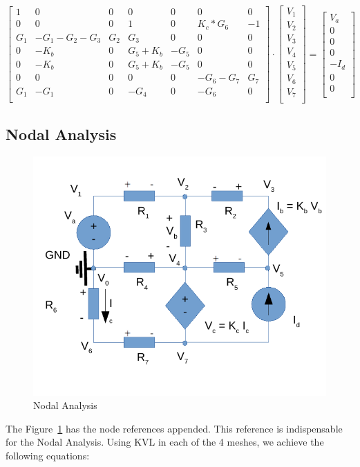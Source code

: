 \[
\begin{bmatrix}
1 & 0 & 0 & 0 & 0 & 0 & 0\\
0 & 0 & 0 & 1 & 0 & K_c * G_6 & -1\\
G_1 & -G_1-G_2 - G_3 & G_2 & G_3 & 0 & 0 & 0\\
0 & -K_b & 0 & G_5 + K_b & -G_5 & 0 & 0\\
0 & -K_b & 0 & G_5 + K_b & -G_5 & 0 & 0\\
0 & 0 & 0 & 0 & 0 & -G_6-G_7 & G_7\\
G_1 & -G_1 & 0 & -G_4 & 0 & -G_6 & 0\\
\end{bmatrix}
\cdot
\begin{bmatrix}
V_1\\
V_2\\
V_3\\
V_4\\
V_5\\
V_6\\
V_7\\
\end{bmatrix}
=
\begin{bmatrix}
V_a\\
0\\
0\\
0\\
-I_d\\
0\\
0\\
\end{bmatrix}
\]


\subsection{Nodal Analysis}

\begin{figure}
\includegraphics[width=0.4\linewidth]{circ_node.pdf}
\caption{Nodal Analysis}
\label{fig:circuitNodes}
\end{figure}

The Figure~\ref{fig:circuitNodes} has the node references appended.
This reference is indispensable for the Nodal Analysis.
Using KVL in each of the 4 meshes, we achieve the following equations:

